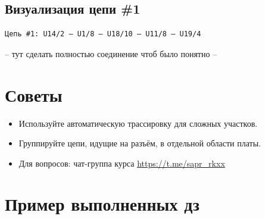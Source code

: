 \documentclass[a4paper, 12pt]{article}
\begin{document}
\subsection{Визуализация цепи \#1}
\begin{verbatim}
Цепь #1: U14/2 — U1/8 — U18/10 — U11/8 — U19/4
\end{verbatim}

-- тут сделать полностью соединение чтоб было понятно --


\section{Советы}
\begin{itemize}
	\item Используйте автоматическую трассировку для сложных участков.
	\item Группируйте цепи, идущие на разъём, в отдельной области платы.
	\item Для вопросов: чат-группа курса \url{https://t.me/sapr_rkxx}
\end{itemize}

\section{Пример выполненных дз}
\end{document}
